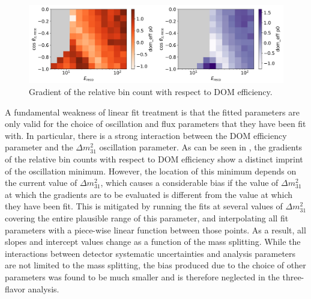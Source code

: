 \begin{figure}
    \centering
    \includegraphics[width=0.9\linewidth]{figures/measurement/systematics/detector/dom_eff_slopes.png}
    \caption{Gradient of the relative bin count with respect to DOM efficiency.}
    \label{fig:dom-efficiency-slopes}
\end{figure}
A fundamental weakness of linear fit treatment is that the fitted parameters are only valid for the  choice of oscillation and flux parameters that they have been fit with. In particular, there is a strong interaction between the DOM efficiency parameter and the $\Delta m^2_{31}$ oscillation parameter. As can be seen in , the gradients of the relative bin counts with respect to DOM efficiency show a distinct imprint of the oscillation minimum. However, the location of this minimum depends on the current value of $\Delta m^2_{31}$, which causes a considerable bias if the value of $\Delta m^2_{31}$ at which the gradients are to be evaluated is different from the value at which they have been fit. This is mitigated by running the fits at several values of $\Delta m^2_{31}$ covering the entire plausible range of this parameter, and interpolating all fit parameters with a piece-wise linear function between those points. As a result, all slopes and intercept values change as a function of the mass splitting. While the interactions between detector systematic uncertainties and analysis parameters are not limited to the mass splitting, the bias produced due to the choice of other parameters was found to be much smaller and is therefore neglected in the three-flavor analysis. 

